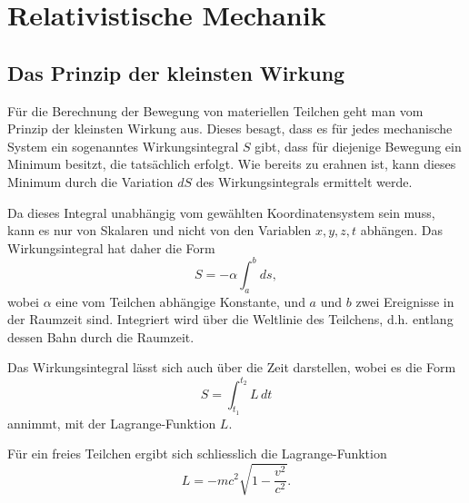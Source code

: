 
\section{Relativistische Mechanik 
\label{relativ:section:rel_mechanik}}

\subsection{Das Prinzip der kleinsten Wirkung 
\label{relativ:section:kleinste-wirkung}}

Für die Berechnung der Bewegung von materiellen Teilchen geht man
vom Prinzip der kleinsten Wirkung aus.
Dieses besagt, dass es für jedes mechanische System ein sogenanntes
Wirkungsintegral \(S\) gibt,
dass für diejenige Bewegung ein Minimum besitzt, die tatsächlich erfolgt.
Wie bereits zu erahnen ist, kann dieses Minimum durch die Variation \(dS\)
des Wirkungsintegrals ermittelt werde.

Da dieses Integral unabhängig vom gewählten Koordinatensystem sein muss,
kann es nur von Skalaren und nicht von den Variablen \(x, y, z, t\) abhängen.
Das Wirkungsintegral hat daher die Form
\begin{equation}
    S = - \alpha \int_{a}^{b} ds,
\label{relativ:eqn:wirk-int-grundform}
\end{equation}
wobei \(\alpha\) eine vom Teilchen abhängige Konstante,
und \(a\) und \(b\) zwei Ereignisse in der Raumzeit sind.
Integriert wird über die Weltlinie des Teilchens,
d.h. entlang dessen Bahn durch die Raumzeit.

Das Wirkungsintegral lässt sich auch über die Zeit darstellen,
wobei es die Form
\begin{equation}
    S = \int_{t_1}^{t_2} L \, dt
\label{relativ:eqn:wirk-int-zeit}
\end{equation}
annimmt, mit der Lagrange-Funktion \(L\).


Für ein freies Teilchen ergibt sich schliesslich die Lagrange-Funktion
\begin{equation}
    L = -mc^2 \sqrt{1-\frac{v^2}{c^2}}.
\label{relativ:eqn:lagrange-freies-teilchen}
\end{equation}
